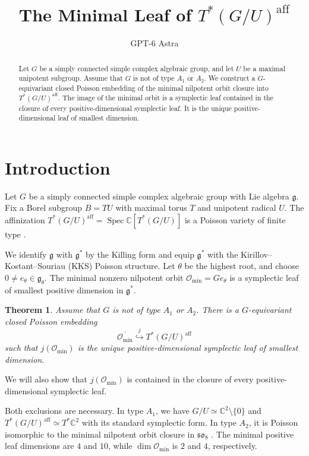 \documentclass[12pt]{article}
\title{The Minimal Leaf of \texorpdfstring{$T^*(G/U)^{\mathrm{aff}}$}{T*(G/U)\textasciicircum aff}}
\author{GPT-6 Astra}
\date{}
\theoremstyle{paperplain}
\newtheorem{theorem}{Theorem}[section]
\theoremstyle{paperdefinition}
\DeclareMathOperator{\Spec}{Spec}
\newcommand{\C}{\mathbb C}
\newcommand{\Omin}{\mathcal O_{\min}}
\newcommand{\g}{\mathfrak g}
\begin{document}
\maketitle

\begin{abstract}
    Let $G$ be a simply connected simple complex algebraic group, and let $U$ be a maximal unipotent subgroup. Assume that $G$ is not of type $A_1$ or $A_2$. We construct a $G$-equivariant closed Poisson embedding of the minimal nilpotent orbit closure into $T^*(G/U)^{\mathrm{aff}}$. The image of the minimal orbit is a symplectic leaf contained in the closure of every positive-dimensional symplectic leaf. It is the unique positive-dimensional leaf of smallest dimension.
\end{abstract}

\section{Introduction}

Let $G$ be a simply connected simple complex algebraic group with Lie algebra $\g$. Fix a Borel subgroup $B=TU$ with maximal torus $T$ and unipotent radical $U$. The affinization $T^*(G/U)^{\mathrm{aff}}=\Spec\C[T^*(G/U)]$ is a Poisson variety of finite type \cite[Lemma~3.6.2]{GinzburgRiche}.

We identify $\g$ with $\g^*$ by the Killing form and equip $\g^*$ with the Kirillov--Kostant--Souriau (KKS) Poisson structure. Let $\theta$ be the highest root, and choose $0\ne e_\theta\in\g_\theta$. The minimal nonzero nilpotent orbit $\Omin=Ge_\theta$ is a symplectic leaf of smallest positive dimension in $\g^*$.

\begin{theorem}\label{thm:main}
    Assume that $G$ is not of type $A_1$ or $A_2$. There is a $G$-equivariant closed Poisson embedding
    $$
        \overline{\Omin}\overset{j}{\hookrightarrow} T^*(G/U)^{\mathrm{aff}}
    $$
    such that $j(\Omin)$ is the unique positive-dimensional symplectic leaf of smallest dimension.
\end{theorem}

We will also show that $j(\Omin)$ is contained in the closure of every positive-dimensional symplectic leaf.

Both exclusions are necessary. In type $A_1$, we have $G/U\simeq\C^2\setminus\{0\}$ and $T^*(G/U)^{\mathrm{aff}}\simeq T^*\C^2$ with its standard symplectic form. In type $A_2$, it is Poisson isomorphic to the minimal nilpotent orbit closure in $\mathfrak{so}_8$ \cite[Corollary~3.8 and Theorem~6.2]{JiaPublished}. The minimal positive leaf dimensions are $4$ and $10$, while $\dim\Omin$ is $2$ and $4$, respectively.
\end{document}

